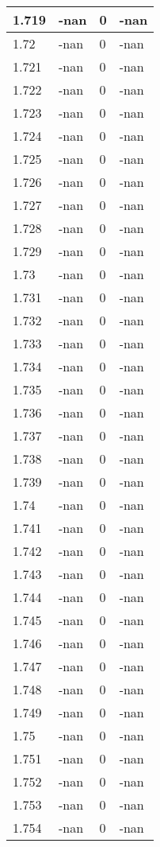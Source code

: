 \documentclass[a4paper,14pt]{extarticle}
\begin{document}
\begin{longtable}{||m{3cm}||m{3cm}|m{3cm}||m{3cm}||}
\hline
1.719 & -nan & 0 & -nan\\
\hline
1.72 & -nan & 0 & -nan\\
\hline
1.721 & -nan & 0 & -nan\\
\hline
1.722 & -nan & 0 & -nan\\
\hline
1.723 & -nan & 0 & -nan\\
\hline
1.724 & -nan & 0 & -nan\\
\hline
1.725 & -nan & 0 & -nan\\
\hline
1.726 & -nan & 0 & -nan\\
\hline
1.727 & -nan & 0 & -nan\\
\hline
1.728 & -nan & 0 & -nan\\
\hline
1.729 & -nan & 0 & -nan\\
\hline
1.73 & -nan & 0 & -nan\\
\hline
1.731 & -nan & 0 & -nan\\
\hline
1.732 & -nan & 0 & -nan\\
\hline
1.733 & -nan & 0 & -nan\\
\hline
1.734 & -nan & 0 & -nan\\
\hline
1.735 & -nan & 0 & -nan\\
\hline
1.736 & -nan & 0 & -nan\\
\hline
1.737 & -nan & 0 & -nan\\
\hline
1.738 & -nan & 0 & -nan\\
\hline
1.739 & -nan & 0 & -nan\\
\hline
1.74 & -nan & 0 & -nan\\
\hline
1.741 & -nan & 0 & -nan\\
\hline
1.742 & -nan & 0 & -nan\\
\hline
1.743 & -nan & 0 & -nan\\
\hline
1.744 & -nan & 0 & -nan\\
\hline
1.745 & -nan & 0 & -nan\\
\hline
1.746 & -nan & 0 & -nan\\
\hline
1.747 & -nan & 0 & -nan\\
\hline
1.748 & -nan & 0 & -nan\\
\hline
1.749 & -nan & 0 & -nan\\
\hline
1.75 & -nan & 0 & -nan\\
\hline
1.751 & -nan & 0 & -nan\\
\hline
1.752 & -nan & 0 & -nan\\
\hline
1.753 & -nan & 0 & -nan\\
\hline
1.754 & -nan & 0 & -nan\\

\end{longtable}
\end{document}
